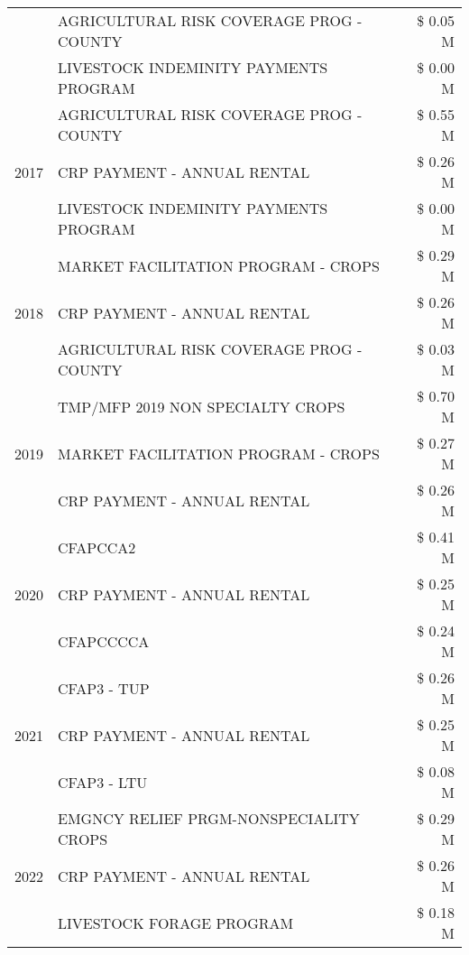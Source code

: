 \begin{tabular}{llr}
 & AGRICULTURAL RISK COVERAGE PROG - COUNTY & \$ 0.05 M \\
 & LIVESTOCK INDEMINITY PAYMENTS PROGRAM & \$ 0.00 M \\
\cline{1-3}
\multirow[t]{3}{*}{2017} & AGRICULTURAL RISK COVERAGE PROG - COUNTY & \$ 0.55 M \\
 & CRP PAYMENT - ANNUAL RENTAL & \$ 0.26 M \\
 & LIVESTOCK INDEMINITY PAYMENTS PROGRAM & \$ 0.00 M \\
\cline{1-3}
\multirow[t]{3}{*}{2018} & MARKET FACILITATION PROGRAM - CROPS & \$ 0.29 M \\
 & CRP PAYMENT - ANNUAL RENTAL & \$ 0.26 M \\
 & AGRICULTURAL RISK COVERAGE PROG - COUNTY & \$ 0.03 M \\
\cline{1-3}
\multirow[t]{3}{*}{2019} & TMP/MFP 2019 NON SPECIALTY CROPS & \$ 0.70 M \\
 & MARKET FACILITATION PROGRAM - CROPS & \$ 0.27 M \\
 & CRP PAYMENT - ANNUAL RENTAL & \$ 0.26 M \\
\cline{1-3}
\multirow[t]{3}{*}{2020} & CFAPCCA2 & \$ 0.41 M \\
 & CRP PAYMENT - ANNUAL RENTAL & \$ 0.25 M \\
 & CFAPCCCCA & \$ 0.24 M \\
\cline{1-3}
\multirow[t]{3}{*}{2021} & CFAP3 - TUP & \$ 0.26 M \\
 & CRP PAYMENT - ANNUAL RENTAL & \$ 0.25 M \\
 & CFAP3 - LTU & \$ 0.08 M \\
\cline{1-3}
\multirow[t]{3}{*}{2022} & EMGNCY RELIEF PRGM-NONSPECIALITY CROPS & \$ 0.29 M \\
 & CRP PAYMENT - ANNUAL RENTAL & \$ 0.26 M \\
 & LIVESTOCK FORAGE PROGRAM & \$ 0.18 M \\
\cline{1-3}
\bottomrule
\end{tabular}
